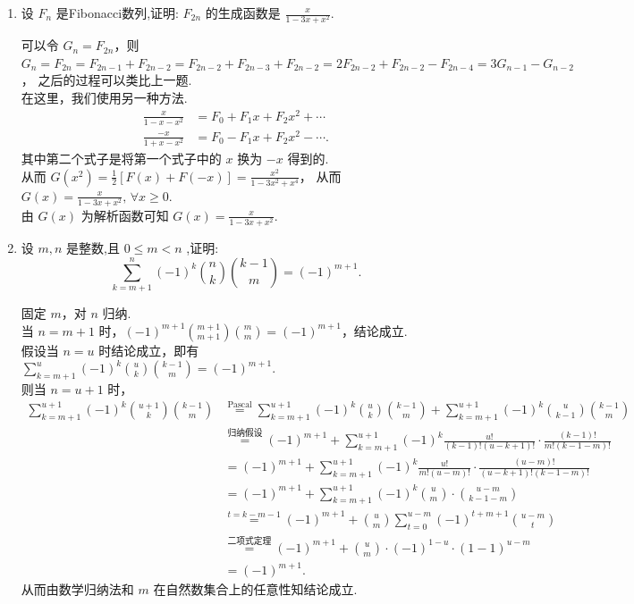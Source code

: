 \begin{enumerate}
    \item[4.]设 \(F_{n}\) 是Fibonacci数列,证明: \(F_{2n}\) 的生成函数是 \(\displaystyle \frac{x}{1 - 3x + x^{2}}.\)
    \begin{solution}
        可以令 $G_n=F_{2n}$，则 $G_n=F_{2n}=F_{2n-1}+F_{2n-2}=F_{2n-2}+F_{2n-3}+F_{2n-2}=2F_{2n-2}+F_{2n-2}-F_{2n-4}=3G_{n-1}-G_{n-2}$，
        之后的过程可以类比上一题.\\
        在这里，我们使用另一种方法. 
        \[
            \begin{aligned}
            \frac{x}{1-x-x^2}&=F_0+F_1x+F_2x^2+\cdots\\
            \frac{-x}{1+x-x^2}&=F_0-F_1x+F_2x^2-\cdots.
            \end{aligned}
        \]
        其中第二个式子是将第一个式子中的 $x$ 换为 $-x$ 得到的.\\
        从而 $\displaystyle G(x^2)=\frac{1}{2}\left[ F(x)+F(-x) \right]=\frac{x^2}{1-3x^2+x^4}$，
        从而 $\displaystyle G(x)=\frac{x}{1-3x+x^2},\,\forall x\geq 0$.\\
        由 $G(x)$ 为解析函数可知 $\displaystyle G(x)=\frac{x}{1-3x+x^2}$.
    \end{solution}
    
    \item[5.]设 \(m,n\) 是整数,且 \(0\leq m< n\) ,证明:
    \[\displaystyle\sum_{k = m + 1}^{n}(-1)^{k}\binom{n}{k}\binom{k - 1}{m} = (-1)^{m + 1}.\]
    \begin{solution}
        固定 $m$，对 $n$ 归纳. \\
        当 $n=m+1$ 时，$\displaystyle (-1)^{m+1}\binom{m+1}{m+1}\binom{m}{m}=(-1)^{m+1}$，结论成立.\\
        假设当 $n=u$ 时结论成立，即有 $\displaystyle \sum_{k=m+1}^{u}(-1)^{k}\binom{u}{k}\binom{k - 1}{m}=(-1)^{m+1}$.\\
        则当 $n=u+1$ 时，
        \[
            \begin{aligned}
                \sum_{k = m + 1}^{u+1}(-1)^{k}\binom{u+1}{k}\binom{k - 1}{m}
                &\overset{\mathrm{Pascal}}{=} \sum_{k = m + 1}^{u+1}(-1)^{k}\binom{u}{k}\binom{k - 1}{m}
                +\sum_{k = m + 1}^{u+1}(-1)^{k}\binom{u}{k-1}\binom{k - 1}{m}\\
                &\overset{\text{归纳假设}}{=}(-1)^{m+1}+\sum_{k = m + 1}^{u+1}(-1)^{k}\frac{u!}{(k-1)!(u-k+1)!}\cdot\frac{(k-1)!}{m!(k-1-m)!}\\
                &=(-1)^{m+1}+\sum_{k = m + 1}^{u+1}(-1)^{k}\frac{u!}{m!(u-m)!}\cdot\frac{(u-m)!}{(u-k+1)!(k-1-m)!}\\
                &=(-1)^{m+1}+\sum_{k = m + 1}^{u+1}(-1)^{k}\binom{u}{m}\cdot\binom{u-m}{k-1-m}\\
                &\overset{t=k-m-1}{=}(-1)^{m+1}+\binom{u}{m}\sum_{t=0}^{u-m}(-1)^{t+m+1}\binom{u-m}{t}\\
                &\overset{\text{二项式定理}}{=}(-1)^{m+1}+\binom{u}{m}\cdot(-1)^{1-u}\cdot(1-1)^{u-m}\\
                &=(-1)^{m+1}.
            \end{aligned}
        \]
        从而由数学归纳法和 $m$ 在自然数集合上的任意性知结论成立.
    \end{solution}


\end{enumerate}
